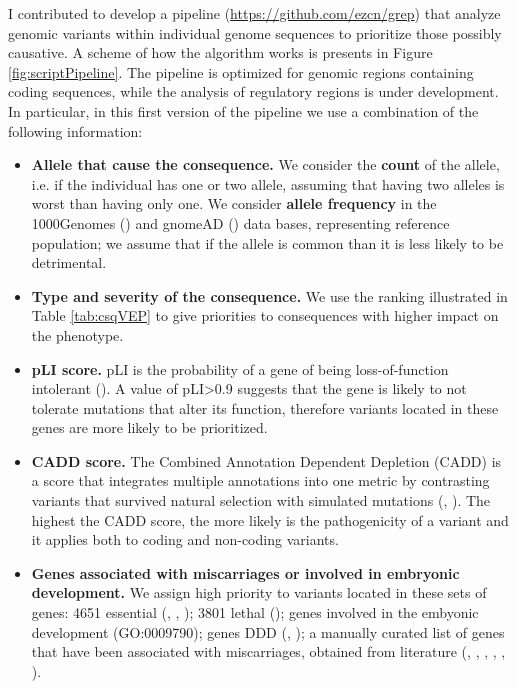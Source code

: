 \documentclass[
tikz,
11pt, %
oneside, %
english, %
singlespacing, %
headsepline, %
]{MastersDoctoralThesisV2} %
\begin{document}
I contributed to develop a pipeline (\url{https://github.com/ezcn/grep}) that analyze genomic variants within individual genome sequences to prioritize those possibly causative. A scheme of how the algorithm works is presents in Figure \ref{fig:scriptPipeline}. The pipeline is optimized for genomic regions containing coding sequences, while the analysis of regulatory regions is under development. In particular, in this first version of the pipeline we use a combination of the following information:  
\begin{itemize}
\item \textbf{Allele that cause the consequence.} We consider the \textbf{count} of the allele, i.e. if the individual has one or two allele, assuming that having two alleles is worst than having only one. We consider \textbf{allele frequency} in the 1000Genomes (\cite{1000genome2015global}) and gnomeAD (\cite{karczewskigenome}) data bases, representing reference population; we assume that if the allele is common than it is less likely to be detrimental. 
\item \textbf{Type and severity of the consequence.} We use the ranking illustrated in Table \ref{tab:csqVEP} to give priorities to consequences with higher impact on the phenotype.  
\item \textbf{pLI score.} pLI is the probability of a gene of being loss-of-function intolerant (\cite{lek2016analysis}). A value of pLI>0.9 suggests that the gene is likely to not tolerate mutations that alter its function, therefore variants located in these genes are more likely to be prioritized.  
\item \textbf{CADD score.} The Combined Annotation Dependent Depletion (CADD) is a  score that integrates multiple annotations into one metric by contrasting variants that survived natural selection with simulated mutations (\cite{kircher2014general}, \cite{rentzsch2019cadd}). The highest the CADD score, the more likely is the pathogenicity of a variant and it applies both to coding and non-coding variants. 
\item \textbf{Genes associated with miscarriages or involved in embryonic development.} We assign high priority to variants located in these sets of genes: 4651 essential  (\cite{blomen2015gene}, \cite{wang2015identification}, \cite{hart2015high}); 3801 lethal (\cite{dawes2019gene}); genes involved in the embyonic development (GO:0009790); genes DDD (\cite{firth2011deciphering}, \cite{firth2009decipher}); a manually curated list of genes that have been associated with miscarriages, obtained from literature (\cite{laisk2019genetic}, \cite{pereza2017systematic}, \cite{qiao2016whole}, \cite{rull2012genetics}, \cite{colley2019potential}, \cite{quintero2017novel}). 
\end{itemize}
\end{document}

